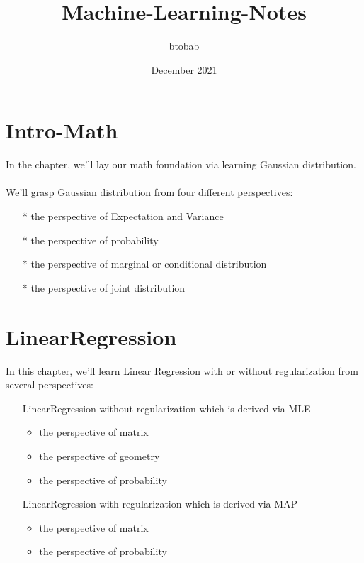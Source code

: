 \documentclass{report}
\title{Machine-Learning-Notes}
\author{btobab}
\date{December 2021}
\begin{document}
\maketitle
{}
\tableofcontents
\newpage
{}

\chapter{Intro-Math}
In the chapter, we'll lay our math foundation via learning Gaussian distribution.\\\\
We'll grasp Gaussian distribution from four different perspectives:
\begin{itemize}
	\item[*] the perspective of Expectation and Variance
	\item[*] the perspective of probability
	\item[*] the perspective of marginal or conditional distribution
	\item[*] the perspective of joint distribution
\end{itemize}





\chapter{LinearRegression}
In this chapter, we'll learn Linear Regression with or without regularization from several perspectives:
\begin{itemize}
	\item[] LinearRegression without regularization which is derived via MLE
	\begin{itemize}
	\item the perspective of matrix
	\item the perspective of geometry
	\item the perspective of probability
	\end{itemize}
	
	\item[] LinearRegression with regularization which is derived via MAP
	\begin{itemize}
	\item the perspective of matrix
	\item the perspective of probability
	\end{itemize}
\end{itemize}

\end{document}

